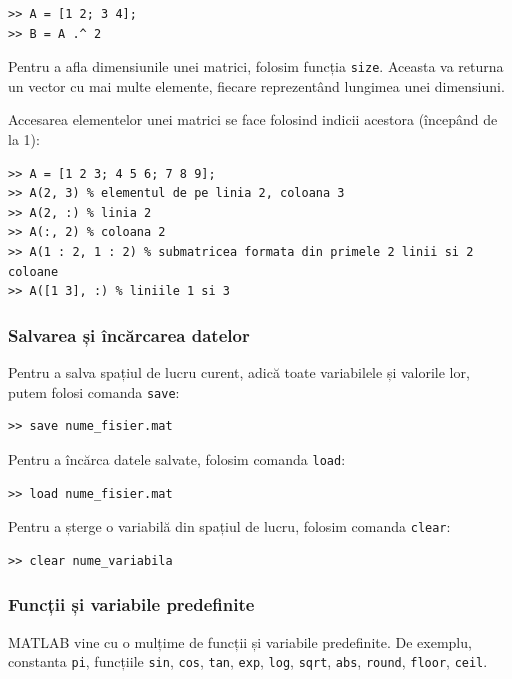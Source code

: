 \documentclass{exam}
\begin{document}
\begin{lstlisting}
>> A = [1 2; 3 4];
>> B = A .^ 2
\end{lstlisting}

\par Pentru a afla dimensiunile unei matrici, folosim funcția \verb|size|. Aceasta
va returna un vector cu mai multe elemente, fiecare reprezentând lungimea unei
dimensiuni.

\par Accesarea elementelor unei matrici se face folosind indicii acestora (începând de la 1):

\begin{lstlisting}
>> A = [1 2 3; 4 5 6; 7 8 9];
>> A(2, 3) % elementul de pe linia 2, coloana 3
>> A(2, :) % linia 2
>> A(:, 2) % coloana 2
>> A(1 : 2, 1 : 2) % submatricea formata din primele 2 linii si 2 coloane
>> A([1 3], :) % liniile 1 si 3
\end{lstlisting}

\subsubsection{Salvarea și încărcarea datelor}

\par Pentru a salva spațiul de lucru curent, adică toate variabilele și
valorile lor, putem folosi comanda \verb|save|:

\begin{lstlisting}
>> save nume_fisier.mat
\end{lstlisting}

\par Pentru a încărca datele salvate, folosim comanda \verb|load|:

\begin{lstlisting}
>> load nume_fisier.mat
\end{lstlisting}

\par Pentru a șterge o variabilă din spațiul de lucru, folosim comanda
\verb|clear|:

\begin{lstlisting}
>> clear nume_variabila
\end{lstlisting}

\subsubsection{Funcții și variabile predefinite}

\par MATLAB vine cu o mulțime de funcții și variabile predefinite. De exemplu,
constanta \verb|pi|, funcțiile \verb|sin|, \verb|cos|, \verb|tan|, \verb|exp|,
\verb|log|, \verb|sqrt|, \verb|abs|, \verb|round|, \verb|floor|, \verb|ceil|.
\end{document}

